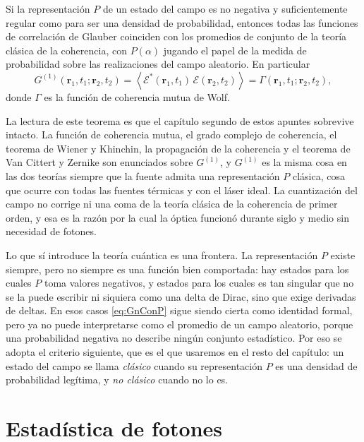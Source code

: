     \begin{myteo}\label{teo:RecuperacionWolf}
        Si la representación $P$ de un estado del campo es no negativa y suficientemente regular como para ser una densidad de probabilidad, entonces todas las funciones de correlación de Glauber coinciden con los promedios de conjunto de la teoría clásica de la coherencia, con $P(\alpha)$ jugando el papel de la medida de probabilidad sobre las realizaciones del campo aleatorio. En particular
        \begin{equation}\label{eq:G1esGamma}
            G^{(1)}\left(\mathbf{r}_{1},t_{1};\mathbf{r}_{2},t_{2}\right) = \left\langle \mathcal{E}^{*}(\mathbf{r}_{1},t_{1})\,\mathcal{E}(\mathbf{r}_{2},t_{2})\right\rangle = \Gamma\left(\mathbf{r}_{1},t_{1};\mathbf{r}_{2},t_{2}\right),
        \end{equation}
        donde $\Gamma$ es la función de coherencia mutua de Wolf.
    \end{myteo}

    La lectura de este teorema es que el capítulo segundo de estos apuntes sobrevive intacto. La función de coherencia mutua, el grado complejo de coherencia, el teorema de Wiener y Khinchin, la propagación de la coherencia y el teorema de Van Cittert y Zernike son enunciados sobre $G^{(1)}$, y $G^{(1)}$ es la misma cosa en las dos teorías siempre que la fuente admita una representación $P$ clásica, cosa que ocurre con todas las fuentes térmicas y con el láser ideal. La cuantización del campo no corrige ni una coma de la teoría clásica de la coherencia de primer orden, y esa es la razón por la cual la óptica funcionó durante siglo y medio sin necesidad de fotones.

    Lo que sí introduce la teoría cuántica es una frontera. La representación $P$ existe siempre, pero no siempre es una función bien comportada: hay estados para los cuales $P$ toma valores negativos, y estados para los cuales es tan singular que no se la puede escribir ni siquiera como una delta de Dirac, sino que exige derivadas de deltas. En esos casos \eqref{eq:GnConP} sigue siendo cierta como identidad formal, pero ya no puede interpretarse como el promedio de un campo aleatorio, porque una probabilidad negativa no describe ningún conjunto estadístico. Por eso se adopta el criterio siguiente, que es el que usaremos en el resto del capítulo: un estado del campo se llama \textit{clásico} cuando su representación $P$ es una densidad de probabilidad legítima, y \textit{no clásico} cuando no lo es.

\section{Estadística de fotones}

